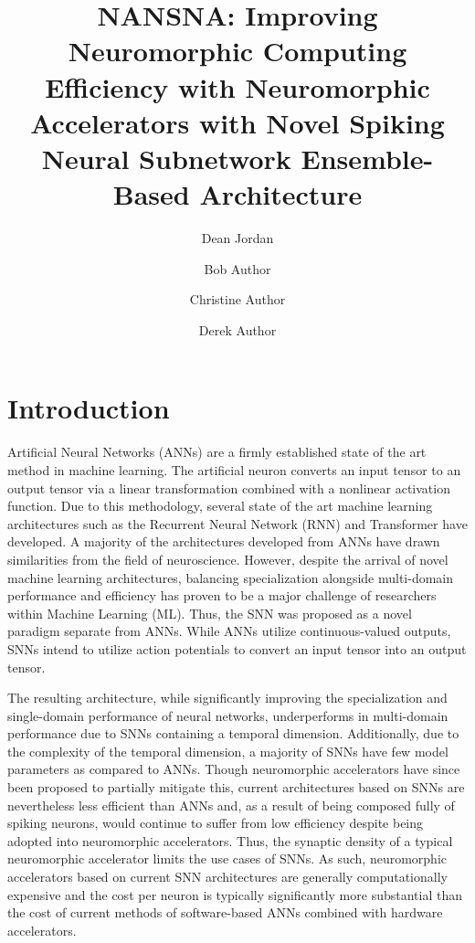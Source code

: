 \documentclass[fleqn,10pt]{wlscirep}
\title{NANSNA: Improving Neuromorphic Computing Efficiency with Neuromorphic Accelerators with Novel Spiking Neural Subnetwork Ensemble-Based Architecture}
\author[1,*]{Dean Jordan}
\author[2]{Bob Author}
\author[1,2,+]{Christine Author}
\author[2,+]{Derek Author}
\affil[1]{University of Michigan, Artificial Intelligence, South Lyon, 48178, United States}
\affil[2]{Affiliation, department, city, postcode, country}
\affil[*]{jordan.dean161@gmail.com}
\affil[+]{these authors contributed equally to this work}
\begin{document}
\flushbottom
\maketitle
%
%
\thispagestyle{empty}

\section*{Introduction}

Artificial Neural Networks (ANNs) are a firmly established state of the art method in machine learning. The artificial neuron converts an input tensor to an output tensor via a linear transformation combined with a nonlinear activation function. Due to this methodology, several state of the art machine learning architectures such as the Recurrent Neural Network (RNN) and Transformer have developed. A majority of the architectures developed from ANNs have drawn similarities from the field of neuroscience. However, despite the arrival of novel machine learning architectures, balancing specialization alongside multi-domain performance and efficiency has proven to be a major challenge of researchers within Machine Learning (ML). Thus, the SNN was proposed as a novel paradigm separate from ANNs. While ANNs utilize continuous-valued outputs, SNNs intend to utilize action potentials to convert an input tensor into an output tensor.

The resulting architecture, while significantly improving the specialization and single-domain performance of neural networks, underperforms in multi-domain performance due to SNNs containing a temporal dimension. Additionally, due to the complexity of the temporal dimension, a majority of SNNs have few model parameters as compared to ANNs. Though neuromorphic accelerators have since been proposed to partially mitigate this, current architectures based on SNNs are nevertheless less efficient than ANNs and, as a result of being composed fully of spiking neurons, would continue to suffer from low efficiency despite being adopted into neuromorphic accelerators. Thus, the synaptic density of a typical neuromorphic accelerator limits the use cases of SNNs. As such, neuromorphic accelerators based on current SNN architectures are generally computationally expensive and the cost per neuron is typically significantly more substantial than the cost of current methods of software-based ANNs combined with hardware accelerators.
\end{document}
